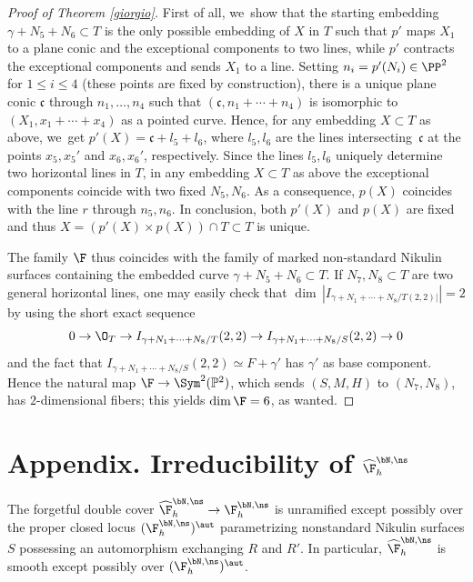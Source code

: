 \begin{proof}[Proof of Theorem \ref{giorgio}]
First of all, we~show that the starting embedding $\gamma+N_5+N_6\subset T$ is the only possible embedding of $X$ in $T$ such that $p'$ maps $X_1$ to a plane conic and the exceptional components to two lines, while $p'$ contracts the exceptional components and sends $X_1$ to a line. Setting $n_i=p'(N_i)\in\PP^2$ for $1\leq i\leq 4$ (these points are fixed by construction), there is a unique plane conic $\mathfrak c$ through $n_1,\ldots, n_4$ such that $(\mathfrak c,n_1+\cdots+n_4)$ is isomorphic to $(X_1,x_1+\cdots+x_4)$ as a pointed curve. Hence, for any embedding $X\subset T$ as above, we~get $p'(X)=\mathfrak c+l_5+l_6$, where $l_5,l_6$ are the lines intersecting~$\mathfrak c$ at the points $x_5,x_5'$ and $x_6,x_6'$, respectively. Since the lines $l_5,l_6$ uniquely determine two horizontal lines in $T$, in any embedding $X\subset T$ as above the exceptional components coincide with two fixed $N_5,N_6$. As a consequence, $p(X)$ coincides with the line $r$ through $n_5,n_6$. In conclusion, both $p'(X)$ and $p(X)$ are fixed and thus $X=(p'(X)\times p(X))\cap T\subset T$ is unique.

The family $\F$ thus coincides with the family of marked non-standard Nikulin surfaces containing the embedded curve $\gamma+N_5+N_6\subset T$. If $N_7,N_8\subset T$ are two general horizontal lines, one may easily check that $\dim\,|I_{\gamma+N_1+\cdots+N_8/T(2,2)|}|=2$ by using the short exact sequence\vspace*{-3pt}
\[
0\to \O_T\to I_{\gamma+N_1+\cdots+N_8/T}(2,2)\to I_{\gamma+N_1+\cdots+N_8/S}(2,2)\to 0
\]
and the fact that $I_{\gamma+N_1+\cdots+N_8/S}(2,2)\simeq F+\gamma'$ has $\gamma'$ as base component. Hence the natural map $\F\to \Sym^2(\mathbb P^2)$, which sends $(S,M,H)$ to $(N_7,N_8)$, has $2$-dimensional fibers; this yields $\dim\F=6$, as wanted.\Changelback
\end{proof}

\appendix

\section*{Appendix. Irreducibility of \texorpdfstring{$\widehat{\F}_h^{\bN,\ns}$}{F}}

The forgetful double cover $\widehat{\F}_h^{\bN,\ns} \to \F_h^{\bN,\ns}$ is unramified except possibly over the proper closed locus $(\F_h^{\bN,\ns})^\aut$ parametrizing nonstandard Nikulin surfaces $S$ \hbox{possessing} an automorphism exchanging $R$ and $R'$. In particular, $\widehat{\F}_h^{\bN,\ns}$ is
smooth except possibly over $(\F_h^{\bN,\ns})^\aut$.


